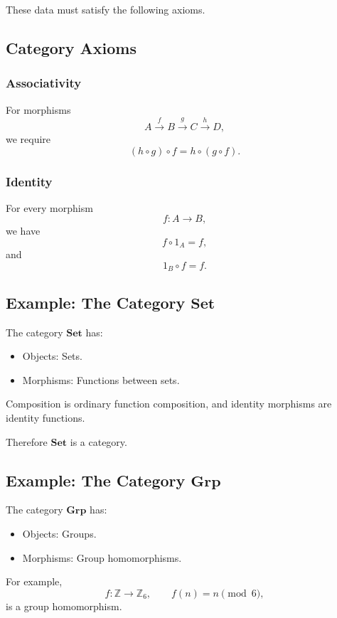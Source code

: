 These data must satisfy the following axioms.

\subsection{Category Axioms}

\subsubsection{Associativity}

For morphisms
\[
A\xrightarrow{f}B\xrightarrow{g}C\xrightarrow{h}D,
\]
we require
\[
(h\circ g)\circ f
=
h\circ(g\circ f).
\]

\subsubsection{Identity}

For every morphism
\[
f:A\to B,
\]
we have
\[
f\circ 1_A=f,
\]
and
\[
1_B\circ f=f.
\]

\subsection{Example: The Category \texorpdfstring{$\mathbf{Set}$}{Set}}

The category $\mathbf{Set}$ has:

\begin{itemize}
    \item Objects: Sets.
    \item Morphisms: Functions between sets.
\end{itemize}

Composition is ordinary function composition, and identity morphisms are identity functions.

Therefore $\mathbf{Set}$ is a category.

\subsection{Example: The Category \texorpdfstring{$\mathbf{Grp}$}{Grp}}

The category $\mathbf{Grp}$ has:

\begin{itemize}
    \item Objects: Groups.
    \item Morphisms: Group homomorphisms.
\end{itemize}

For example,
\[
f:\mathbb Z\to\mathbb Z_6,
\qquad
f(n)=n \pmod 6,
\]
is a group homomorphism.

